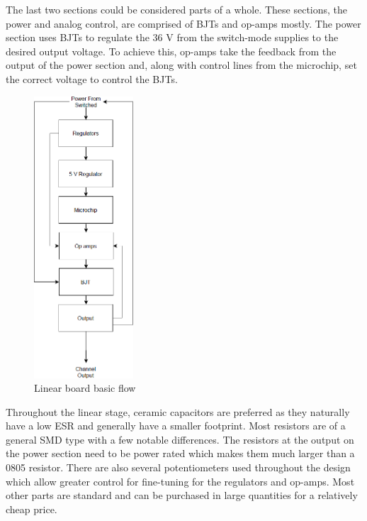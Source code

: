 \documentclass[15pt]{article}
\begin{document}
The last two sections could be considered parts of a whole. These sections, the power and analog control, are comprised of BJTs and op-amps mostly. The power section uses BJTs to regulate the 36 V from the switch-mode supplies to the desired output voltage. To achieve this, op-amps take the feedback from the output of the power section and, along with control lines from the microchip, set the correct voltage to control the BJTs.

\begin{figure}
    \begin{center}
      \includegraphics[width=0.33\textwidth]{chase7}
    \end{center}
    \caption{Linear board basic flow}
    \label{fig:chase7}
  \end{figure}
Throughout the linear stage, ceramic capacitors are preferred as they naturally have a low ESR and generally have a smaller footprint. Most resistors are of a general SMD type with a few notable differences. The resistors at the output on the power section need to be power rated which makes them much larger than a 0805 resistor. There are also several potentiometers used throughout the design which allow greater control for fine-tuning for the regulators and op-amps. Most other parts are standard and can be purchased in large quantities for a relatively cheap price.
\end{document}
